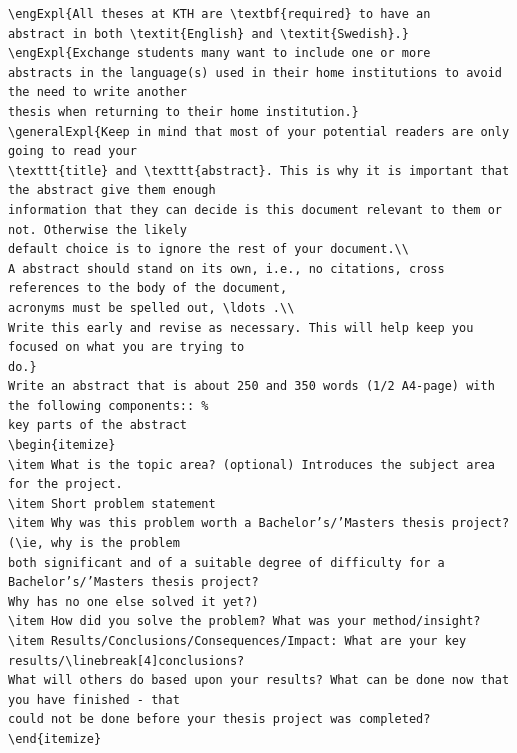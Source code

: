\begin{lstlisting}[language={[LaTeX]TeX}, caption={\LaTeX~code for the English abstract}, label=lst:latexAbtractsExampleEnglish] 
\engExpl{All theses at KTH are \textbf{required} to have an
abstract in both \textit{English} and \textit{Swedish}.}
\engExpl{Exchange students many want to include one or more
abstracts in the language(s) used in their home institutions to avoid the need to write another
thesis when returning to their home institution.}
\generalExpl{Keep in mind that most of your potential readers are only going to read your
\texttt{title} and \texttt{abstract}. This is why it is important that the abstract give them enough
information that they can decide is this document relevant to them or not. Otherwise the likely
default choice is to ignore the rest of your document.\\
A abstract should stand on its own, i.e., no citations, cross references to the body of the document,
acronyms must be spelled out, \ldots .\\
Write this early and revise as necessary. This will help keep you focused on what you are trying to
do.}
Write an abstract that is about 250 and 350 words (1/2 A4-page) with the following components:: %
key parts of the abstract
\begin{itemize}
\item What is the topic area? (optional) Introduces the subject area for the project.
\item Short problem statement
\item Why was this problem worth a Bachelor’s/’Masters thesis project? (\ie, why is the problem
both significant and of a suitable degree of difficulty for a Bachelor’s/’Masters thesis project?
Why has no one else solved it yet?)
\item How did you solve the problem? What was your method/insight?
\item Results/Conclusions/Consequences/Impact: What are your key results/\linebreak[4]conclusions?
What will others do based upon your results? What can be done now that you have finished - that
could not be done before your thesis project was completed?
\end{itemize}
\end{lstlisting}

